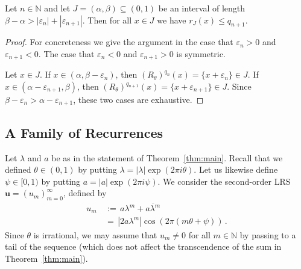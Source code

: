 \documentclass[a4paper,UKenglish,cleveref, autoref, thm-restate]{lipics-v2021}
\begin{document}
\begin{proposition}
    Let $n \in \mathbb N$ and let $J=(\alpha,\beta)\subseteq (0,1)$ be an interval of length $\beta-\alpha > |\varepsilon_n| + |\varepsilon_{n+1}|$.  
    Then for all $x\in J$ we have $r_J(x) \leq q_{n+1}$.
    \label{prop:return}
\end{proposition}
\begin{proof}
For concreteness we give the argument in the case that $\varepsilon_n>0$ and $\varepsilon_{n+1}<0$.  The case that $\varepsilon_n<0$  and $\varepsilon_{n+1}>0$ is symmetric.

Let $x \in J$. 
If $x \in (\alpha,\beta-\varepsilon_n)$,
then $(R_\theta)^{q_n}(x)=\{x+\varepsilon_n\} \in J$.  
If $x \in (\alpha-\varepsilon_{n+1},\beta)$, then $(R_\theta)^{q_{n+1}}(x)=\{x+\varepsilon_{n+1}\} \in J$.
Since $\beta-\varepsilon_{n}>\alpha-\varepsilon_{n+1}$, these two cases are exhaustive.
 \end{proof}

\subsection{A Family of Recurrences}
\label{sec:recurrences}
Let $\lambda$ and $a$ be as in the statement of Theorem~\ref{thm:main}.
Recall that we defined $\theta \in (0,1)$ by putting $\lambda = |\lambda|\exp(2\pi i \theta)$.
Let us likewise define $\psi \in [0,1)$ by putting $a = |a|\exp(2\pi i \psi)$.
We consider the second-order LRS $\boldsymbol u = (u_m)_{m=0}^\infty$, defined by 
\begin{equation}
\begin{aligned}
    u_m &\, := \, a\lambda^m+\overline{a\lambda^m} \\ & \, = \, |2a\lambda^m| \cos(2\pi(m\theta+\psi))\,  .
\end{aligned}
  \label{eq:def-u}
\end{equation}
Since $\theta$ is irrational,
we may assume that $u_m\neq 0$ for all $m\in \mathbb N$ by passing to a tail of the sequence
(which does not affect the transcendence of the sum in Theorem~\ref{thm:main}).
\end{document}
